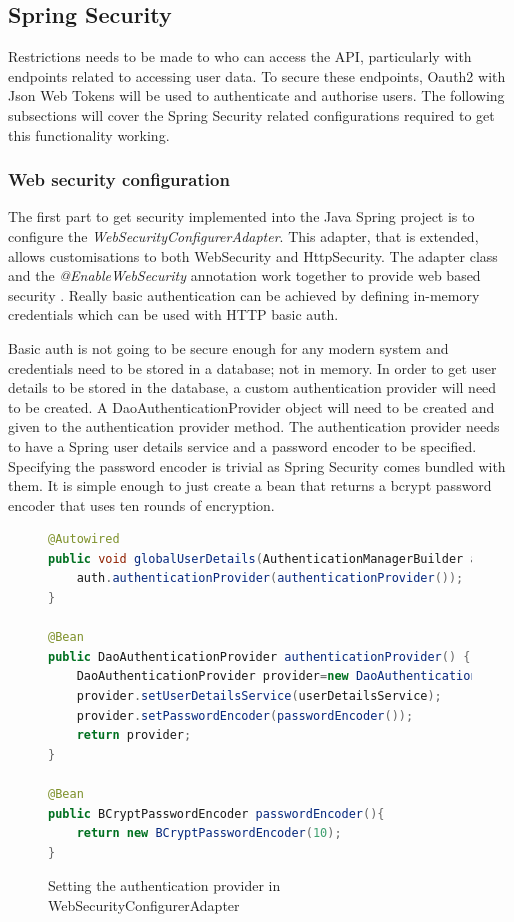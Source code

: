 \clearpage
\subsection{Spring Security}

Restrictions needs to be made to who can access the API, particularly with endpoints related to accessing user data.
To secure these endpoints, Oauth2 with Json Web Tokens will be used to authenticate and authorise users.
The following subsections will cover the Spring Security related configurations required to get this functionality working.




\subsubsection{Web security configuration}
The first part to get security implemented into the Java Spring project is to configure the \textit{WebSecurityConfigurerAdapter}.
This adapter, that is extended, allows customisations to both WebSecurity and HttpSecurity.
The adapter class and the \textit{@EnableWebSecurity} annotation work together to provide web based security \cite{winch2013springsecurity}.
Really basic authentication can be achieved by defining in-memory credentials which can be used with HTTP basic auth.

Basic auth is not going to be secure enough for any modern system and credentials need to be stored in a database; not in memory.
In order to get user details to be stored in the database, a custom authentication provider will need to be created.
A DaoAuthenticationProvider object will need to be created and given to the authentication provider method.
The authentication provider needs to have a Spring user details service and a password encoder to be specified.
Specifying the password encoder is trivial as Spring Security comes bundled with them. 
It is simple enough to just create a bean that returns a bcrypt password encoder that uses ten rounds of encryption.


\begin{figure}[ht]
    \centering
    \begin{lstlisting}[language=Java]
@Autowired
public void globalUserDetails(AuthenticationManagerBuilder auth) {
    auth.authenticationProvider(authenticationProvider());
}

@Bean
public DaoAuthenticationProvider authenticationProvider() {
    DaoAuthenticationProvider provider=new DaoAuthenticationProvider();
    provider.setUserDetailsService(userDetailsService);
    provider.setPasswordEncoder(passwordEncoder());
    return provider;
}       

@Bean
public BCryptPasswordEncoder passwordEncoder(){
    return new BCryptPasswordEncoder(10);
}
    \end{lstlisting}
    \caption{Setting the authentication provider in WebSecurityConfigurerAdapter}
    \label{settingauthprovider}
\end{figure}

